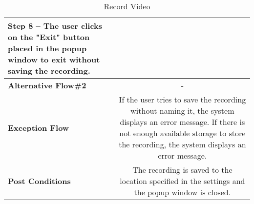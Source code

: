 \begin{table}[H]
\begin{tabular}{|l|C|}
          Step 8 -- The user clicks on the "Exit" button placed in the popup window to exit without saving the recording. \\
         \hline
          \textbf{Alternative Flow\#2} & - \\
         \hline
          \textbf{Exception Flow} & If the user tries to save the recording without naming it, the system displays an error message. If there is not enough available storage to store the recording, the system displays an error message.\\
         \hline
          \textbf{Post Conditions} & The recording is saved to the location specified in the settings and the popup window is closed. \\ 
         \hline
     \end{tabular}
     \caption{Record Video}
     \label{tab:record_video}
 \end{table}